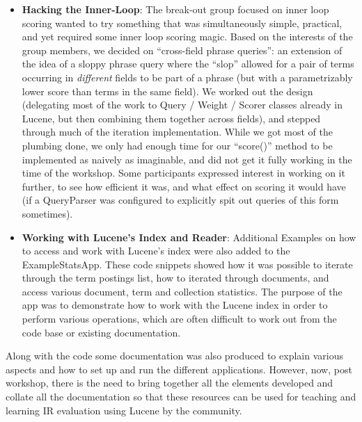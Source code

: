 \begin{itemize}
	\item {\bf Hacking the Inner-Loop}:  The break-out group focused on inner loop scoring wanted to try something that was simultaneously simple, practical, and yet required some inner loop scoring magic.  Based on the interests of the group members, we decided on ``cross-field phrase queries'': an extension of the idea of a sloppy phrase query where the ``slop'' allowed for a pair of terms occurring in {\it different} fields to be part of a phrase (but with a parametrizably lower score than terms in the same field).  We worked out the design (delegating most of the work to Query / Weight / Scorer classes already in Lucene, but then combining them together across fields), and stepped through much of the iteration implementation.  While we got most of the plumbing done, we only had enough time for our ``score()'' method to be implemented as naively as imaginable, and did not get it fully working in the time of the workshop.  Some participants expressed interest in working on it further, to see how efficient it was, and what effect on scoring it would have (if a QueryParser was configured to explicitly spit out queries of this form sometimes).
	\item {\bf Working with Lucene's Index and Reader}: Additional Examples on how to access and work with Lucene's index were also added to the  ExampleStatsApp. These code snippets showed how it was possible to iterate through the term postings list, how to iterated through documents, and access various document, term and collection statistics. The purpose of the app was to demonstrate how to work with the Lucene index in order to perform various operations, which are often difficult to work out from the code base or existing documentation.
\end{itemize}

Along with the code some documentation was also produced to explain various aspects and how to set up and run the different applications. However, now, post workshop, there is the need to bring together all the elements developed and collate all the documentation so that these resources can be used for teaching and learning IR evaluation using Lucene by the community.
